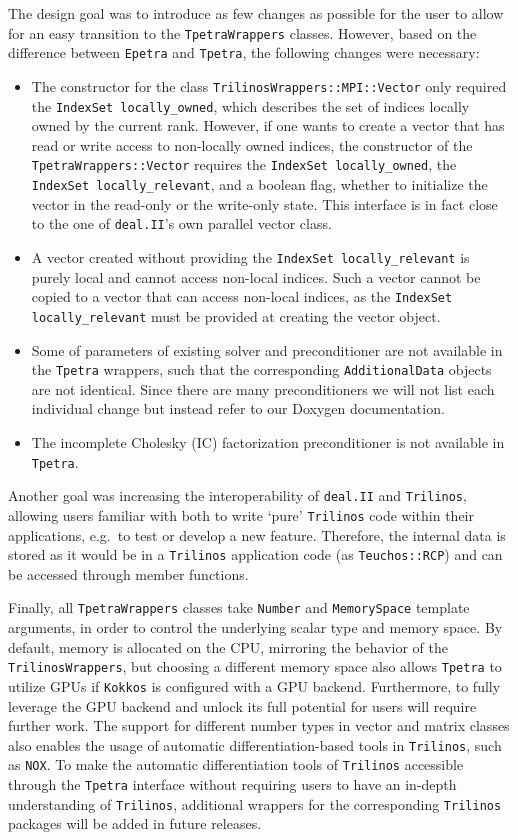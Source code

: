 \documentclass{ansarticle-preprint}
\newcommand{\specialword}[1]{\texttt{#1}}
\newcommand{\dealii}{{\specialword{deal.II}}\xspace}
\newcommand{\trilinos}{{\specialword{Trilinos}}\xspace}
\newcommand{\kokkos}{{\specialword{Kokkos}}\xspace}
\newcommand{\epetra}{{\specialword{Epetra}}\xspace}
\newcommand{\tpetra}{{\specialword{Tpetra}}\xspace}
\begin{document}
The design goal was to introduce as few changes as possible for the user to allow for an easy transition to the
\texttt{TpetraWrappers} classes.
However, based on the difference between \epetra{} and \tpetra{}, the following changes were necessary:
\begin{itemize}
  \item The constructor for the class \texttt{TrilinosWrappers::MPI::Vector} only required the \texttt{IndexSet locally\_owned},
    which describes the set of indices locally owned by the current rank.
    However, if one wants to create a vector that has read or write access to non-locally owned indices,  the constructor of the
    \texttt{TpetraWrappers::Vector} requires the \texttt{IndexSet locally\_owned}, the \texttt{IndexSet locally\_relevant}, and
    a boolean flag, whether to initialize the vector in the read-only or the write-only state.
    This interface is in fact close to the one of \dealii{}'s own parallel vector class.
  \item A vector created without providing the \texttt{IndexSet locally\_relevant} is purely local and cannot access non-local indices.
    Such a vector cannot be copied to a vector that can access non-local indices, as the \texttt{IndexSet locally\_relevant} must
    be provided at creating the vector object. 
  \item Some of parameters of existing solver and preconditioner are
    not available in the \tpetra{} wrappers,
    such that the corresponding \texttt{AdditionalData} objects are not identical. 
    Since there are many preconditioners we will not list each individual change but instead refer 
    to our Doxygen documentation. 
  \item The incomplete Cholesky (IC) factorization preconditioner is not available 
   in \tpetra{}.
\end{itemize}

Another goal was increasing the interoperability of \dealii{} and \trilinos{},
allowing users familiar with both to write `pure' \trilinos{} code within their 
applications, e.g.\ to test or develop a new feature.
Therefore, the internal data is stored as it would be in a \trilinos{} 
application code (as \texttt{Teuchos::RCP}) and can be accessed through member functions. 

Finally,
all \texttt{TpetraWrappers} classes take \texttt{Number} and \texttt{MemorySpace} template arguments,
in order to control the underlying scalar type and memory space.
By default, memory is allocated on the CPU, mirroring the behavior of
the \texttt{TrilinosWrappers}, but choosing a different memory space
also allows \tpetra{} to utilize GPUs if \kokkos{} is configured
with a GPU backend.
Furthermore, to fully leverage the GPU backend and unlock its full potential for users will require further work.
The support for different number types in vector and matrix classes also enables the usage of automatic differentiation-based tools in
\trilinos{}, such as \texttt{NOX}.
To make the automatic differentiation tools of \trilinos{} accessible through the \tpetra{} interface without
requiring users to have an in-depth understanding of \trilinos{}, additional wrappers for the corresponding
\trilinos{} packages will be added in future releases.
\end{document}
